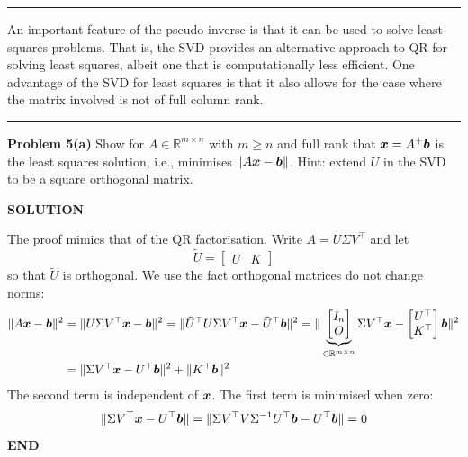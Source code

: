 \documentclass[12pt,a4paper]{article}
\def\bbR{ {\mathbb R} }
\def\x{ {\vc x} }
\def\b{ {\vc b} }
\begin{document}
\rule{\textwidth}{1pt}
An important feature of the pseudo-inverse is that it can be used to solve least squares problems. That is, the SVD provides an alternative approach to QR for solving least squares, albeit one that is computationally less efficient. One advantage of the SVD for least squares is that it also allows for the case where the matrix involved is not of full column rank.

\rule{\textwidth}{1pt}
\textbf{Problem 5(a)} Show for $A \ensuremath{\in} \ensuremath{\bbR}^{m \ensuremath{\times} n}$ with $m \ensuremath{\geq} n$ and full rank that $\ensuremath{\bm{\x}} =  A^+ \ensuremath{\bm{\b}}$ is the least squares solution, i.e., minimises $\| A \ensuremath{\bm{\x}} - \ensuremath{\bm{\b}} \|$. Hint: extend $U$ in the SVD to be a square orthogonal matrix.

\textbf{SOLUTION}

The proof mimics that of the QR factorisation. Write $A =  U \ensuremath{\Sigma} V^\ensuremath{\top}$ and let
\[
\tilde{U} = \begin{bmatrix}U & K \end{bmatrix}
\]
so that $\tilde{U}$ is orthogonal. We use the fact orthogonal matrices do not change norms:
\begin{align*}
\|A \ensuremath{\bm{\x}} - \ensuremath{\bm{\b}} \|^2 &= \|U \ensuremath{\Sigma} V^\ensuremath{\top} \ensuremath{\bm{\x}} - \ensuremath{\bm{\b}} \|^2 = \|\tilde{U}^\ensuremath{\top} U \ensuremath{\Sigma} V^\ensuremath{\top} \ensuremath{\bm{\x}} - \tilde{U}^\ensuremath{\top} \ensuremath{\bm{\b}} \|^2 = 
\|\underbrace{\begin{bmatrix}I_n \\ O \end{bmatrix}}_{\ensuremath{\in} \ensuremath{\bbR}^{m \ensuremath{\times} n}} \ensuremath{\Sigma} V^\ensuremath{\top} \ensuremath{\bm{\x}} - \begin{bmatrix} U^\ensuremath{\top} \\ K^\ensuremath{\top} \end{bmatrix} \ensuremath{\bm{\b}} \|^2 \\
&= \|\ensuremath{\Sigma} V^\ensuremath{\top} \ensuremath{\bm{\x}} - U^\ensuremath{\top} \ensuremath{\bm{\b}} \|^2 + \|K^\ensuremath{\top} \ensuremath{\bm{\b}}\|^2
\end{align*}
The second term is independent of $\ensuremath{\bm{\x}}$. The first term is minimised when zero:
\[
 \|\ensuremath{\Sigma} V^\ensuremath{\top} \ensuremath{\bm{\x}} - U^\ensuremath{\top} \ensuremath{\bm{\b}} \| =\|\ensuremath{\Sigma} V^\ensuremath{\top} V \ensuremath{\Sigma}^{-1} U^\ensuremath{\top} \ensuremath{\bm{\b}}  - U^\ensuremath{\top} \ensuremath{\bm{\b}} \| = 0
\]
\textbf{END}
\end{document}
